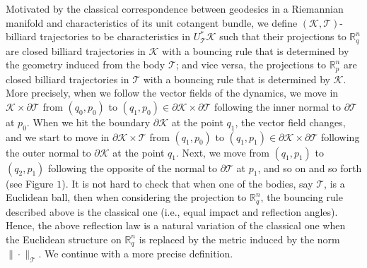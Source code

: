 \documentclass{icmart}
\theoremstyle{definition}
\begin{document}
Motivated by the classical correspondence between %
geodesics in a Riemannian manifold  and %
characteristics of its unit cotangent bundle, %
we define $({\mathcal K},{\mathcal T})$-billiard trajectories  to be characteristics in %
$U_{\mathcal  T}^*{\mathcal K}$ such that  their projections to ${\mathbb R}^n_q$ are  %
closed billiard trajectories in ${\mathcal K}$ with a bouncing rule
that is determined by the geometry induced from the body ${\mathcal T}$; and vice versa, the projections to ${\mathbb R}^n_p$ are  %
closed billiard trajectories in ${\mathcal T}$ with a bouncing rule
that is determined by %
${\mathcal K}$.
More precisely, 
when we follow the  vector fields of the dynamics, %
we move in ${\mathcal K} \times \partial {\mathcal T}$ from $(q_0,p_0)$ to
$(q_1,p_0) \in \partial {\mathcal K} \times \partial {\mathcal T}$ following the inner normal to
$\partial {\mathcal T}$ at $p_0$. When we hit the boundary $\partial {\mathcal K}$ at the
point $q_1$, the vector field  changes, and we start to move in
$\partial {\mathcal K}  \times {\mathcal T}$ from $(q_1,p_0)$ to $(q_1,p_1) \in \partial {\mathcal K} \times \partial {\mathcal T}$ following the outer
 normal to $\partial {\mathcal K}$ at the point $q_1$.  Next, we move from
$(q_1,p_1)$ to $(q_2,p_1)$ following the opposite of the normal to
$\partial {\mathcal T}$ at $p_1$, and so on and so forth (see
Figure $1$). 
It is not hard to check that when one of the bodies, say ${\mathcal T}$, is a Euclidean
ball, then when considering the projection to ${\mathbb R}^{n}_q$, the bouncing rule described above is the
classical one (i.e., equal impact and
reflection angles). 
Hence, the above 
reflection law is a
natural variation of the classical one %
when the Euclidean structure on ${\mathbb R}^n_q$
is replaced by the metric induced by the norm $\| \cdot \|_{{\mathcal T}}$.
We continue with a more precise definition. 
%
\end{document}
